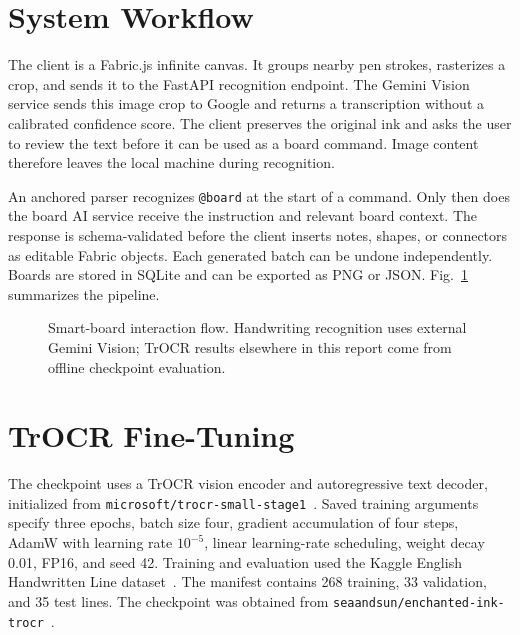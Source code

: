 \documentclass[conference]{IEEEtran}
\begin{document}
\section{System Workflow}
The client is a Fabric.js infinite canvas. It groups nearby pen strokes, rasterizes a crop, and sends it to the FastAPI recognition endpoint. The Gemini Vision service sends this image crop to Google and returns a transcription without a calibrated confidence score. The client preserves the original ink and asks the user to review the text before it can be used as a board command. Image content therefore leaves the local machine during recognition.

An anchored parser recognizes \texttt{@board} at the start of a command. Only then does the board AI service receive the instruction and relevant board context. The response is schema-validated before the client inserts notes, shapes, or connectors as editable Fabric objects. Each generated batch can be undone independently. Boards are stored in SQLite and can be exported as PNG or JSON. Fig.~\ref{fig:workflow} summarizes the pipeline.

\begin{figure}[t]
\centering
{}
\caption{Smart-board interaction flow. Handwriting recognition uses external Gemini Vision; TrOCR results elsewhere in this report come from offline checkpoint evaluation.}
\label{fig:workflow}
\end{figure}

\section{TrOCR Fine-Tuning}
The checkpoint uses a TrOCR vision encoder and autoregressive text decoder, initialized from \texttt{microsoft/trocr-small-stage1}~\cite{li2023trocr}. Saved training arguments specify three epochs, batch size four, gradient accumulation of four steps, AdamW with learning rate $10^{-5}$, linear learning-rate scheduling, weight decay 0.01, FP16, and seed 42. Training and evaluation used the Kaggle English Handwritten Line dataset~\cite{kaggle_english_lines}. The manifest contains 268 training, 33 validation, and 35 test lines. The checkpoint was obtained from \texttt{seaandsun/enchanted-ink-trocr}~\cite{trocr_checkpoint}.
\end{document}
